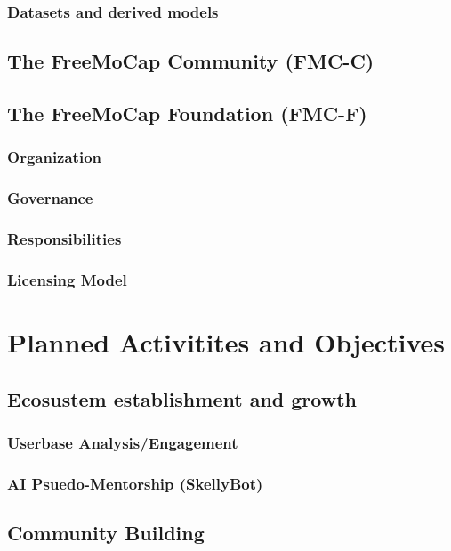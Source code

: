 \documentclass[11pt]{article}
\begin{document}
\subsubsection{Datasets and derived models}


\subsection{The FreeMoCap Community (FMC-C)}

\subsection{The FreeMoCap Foundation (FMC-F)}
\subsubsection{Organization}
\subsubsection{Governance}
\subsubsection{Responsibilities}
\subsubsection{Licensing Model}

\section{Planned Activitites and Objectives}

\subsection{Ecosustem establishment and growth}
\subsubsection{Userbase Analysis/Engagement}
\subsubsection{AI Psuedo-Mentorship (SkellyBot)}

\subsection{Community Building}
\end{document}
